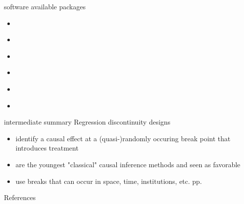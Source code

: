 \documentclass[aspectratio=169]{beamer}
\begin{document}
		\begin{frame}{software}
			available packages
			\begin{itemize}
				\item \href{https://cran.r-project.org/web/packages/rdd/}{\underline{}}
				\item \href{https://rdpackages.github.io/}{\underline{}}
				\item \href{https://rdpackages.github.io/}{\underline{}}
				\item \href{https://rdpackages.github.io/}{\underline{}}
				\item \href{https://rdpackages.github.io/}{\underline{}}
				\item \href{https://rdpackages.github.io/}{\underline{}}
			\end{itemize}
		\end{frame}

		\begin{frame}{intermediate summary}
			Regression discontinuity designs \\ \vspace*{.5cm}
			\begin{itemize}
				\item identify a causal effect at a (quasi-)randomly occuring break point that introduces treatment
				\item are the youngest "classical" causal inference methods and seen as favorable
				\item use breaks that can occur in space, time, institutions, etc. pp. 
			\end{itemize}
		\end{frame}

	\begin{frame}[t, allowframebreaks]{References}
	  \printbibliography
	\end{frame}
\end{document}
